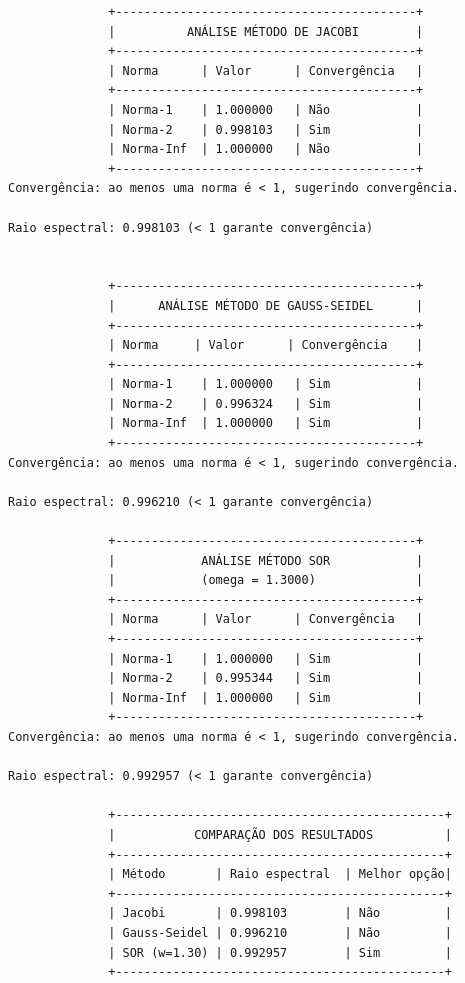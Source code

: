 \documentclass{article}
\theoremstyle{plain}
\theoremstyle{definition}
\theoremstyle{remark}
\begin{document}
\begin{verbatim}
              +------------------------------------------+
              |          ANÁLISE MÉTODO DE JACOBI        |
              +------------------------------------------+
              | Norma      | Valor      | Convergência   |
              +------------------------------------------+
              | Norma-1    | 1.000000   | Não            |
              | Norma-2    | 0.998103   | Sim            |
              | Norma-Inf  | 1.000000   | Não            |
              +------------------------------------------+
Convergência: ao menos uma norma é < 1, sugerindo convergência.

Raio espectral: 0.998103 (< 1 garante convergência)


              +------------------------------------------+
              |      ANÁLISE MÉTODO DE GAUSS-SEIDEL      |
              +------------------------------------------+
              | Norma     | Valor      | Convergência    |
              +------------------------------------------+
              | Norma-1    | 1.000000   | Sim            |
              | Norma-2    | 0.996324   | Sim            |
              | Norma-Inf  | 1.000000   | Sim            |
              +------------------------------------------+
Convergência: ao menos uma norma é < 1, sugerindo convergência.

Raio espectral: 0.996210 (< 1 garante convergência)

              +------------------------------------------+
              |            ANÁLISE MÉTODO SOR            |
              |            (omega = 1.3000)              |
              +------------------------------------------+
              | Norma      | Valor      | Convergência   |
              +------------------------------------------+
              | Norma-1    | 1.000000   | Sim            |
              | Norma-2    | 0.995344   | Sim            |
              | Norma-Inf  | 1.000000   | Sim            |
              +------------------------------------------+
Convergência: ao menos uma norma é < 1, sugerindo convergência.

Raio espectral: 0.992957 (< 1 garante convergência)

              +----------------------------------------------+
              |           COMPARAÇÃO DOS RESULTADOS          |
              +----------------------------------------------+
              | Método       | Raio espectral  | Melhor opção|
              +----------------------------------------------+
              | Jacobi       | 0.998103        | Não         |
              | Gauss-Seidel | 0.996210        | Não         |
              | SOR (w=1.30) | 0.992957        | Sim         |
              +----------------------------------------------+


\end{verbatim}
\end{document}
